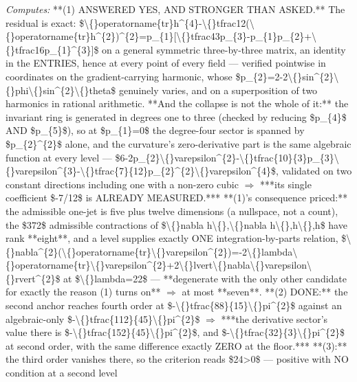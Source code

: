 \begin{description}
\emph{Computes:} **(1) ANSWERED YES, AND STRONGER THAN ASKED.** The residual is exact: \$\textbackslash\{\}operatorname\{tr\}h\textasciicircum{}\{4\}-\textbackslash\{\}tfrac12(\textbackslash\{\}operatorname\{tr\}h\textasciicircum{}\{2\})\textasciicircum{}\{2\}=p\_\{1\}[\textbackslash\{\}tfrac43p\_\{3\}-p\_\{1\}p\_\{2\}+\textbackslash\{\}tfrac16p\_\{1\}\textasciicircum{}\{3\}]\$ on a general symmetric three-by-three matrix, an identity in the ENTRIES, hence at every point of every field --- verified pointwise in coordinates on the gradient-carrying harmonic, whose \$p\_\{2\}=2-2\textbackslash\{\}sin\textasciicircum{}\{2\}\textbackslash\{\}phi\textbackslash\{\}sin\textasciicircum{}\{2\}\textbackslash\{\}theta\$ genuinely varies, and on a superposition of two harmonics in rational arithmetic.  **And the collapse is not the whole of it:** the invariant ring is generated in degrees one to three (checked by reducing \$p\_\{4\}\$ AND \$p\_\{5\}\$), so at \$p\_\{1\}=0\$ the degree-four sector is spanned by \$p\_\{2\}\textasciicircum{}\{2\}\$ alone, and the curvature's zero-derivative part is the same algebraic function at every level --- \$6-2p\_\{2\}\textbackslash\{\}varepsilon\textasciicircum{}\{2\}-\textbackslash\{\}tfrac\{10\}\{3\}p\_\{3\}\textbackslash\{\}varepsilon\textasciicircum{}\{3\}-\textbackslash\{\}tfrac\{7\}\{12\}p\_\{2\}\textasciicircum{}\{2\}\textbackslash\{\}varepsilon\textasciicircum{}\{4\}\$, validated on two constant directions including one with a non-zero cubic \ensuremath{\Rightarrow} ***its single coefficient \$-7/12\$ is ALREADY MEASURED.***  **(1)'s consequence priced:** the admissible one-jet is five plus twelve dimensions (a nullspace, not a count), the \$372\$ admissible contractions of \$\textbackslash\{\}nabla h\textbackslash\{\},\textbackslash\{\}nabla h\textbackslash\{\},h\textbackslash\{\},h\$ have rank **eight**, and a level supplies exactly ONE integration-by-parts relation, \$\textbackslash\{\}nabla\textasciicircum{}\{2\}(\textbackslash\{\}operatorname\{tr\}\textbackslash\{\}varepsilon\textasciicircum{}\{2\})=-2\textbackslash\{\}lambda\textbackslash\{\}operatorname\{tr\}\textbackslash\{\}varepsilon\textasciicircum{}\{2\}+2\textbackslash\{\}lvert\textbackslash\{\}nabla\textbackslash\{\}varepsilon\textbackslash\{\}rvert\textasciicircum{}\{2\}\$ at \$\textbackslash\{\}lambda=22\$ --- **degenerate with the only other candidate for exactly the reason (1) turns on** \ensuremath{\Rightarrow} at most **seven**. **(2) DONE:** the second anchor reaches fourth order at \$-\textbackslash\{\}tfrac\{88\}\{15\}\textbackslash\{\}pi\textasciicircum{}\{2\}\$ against an algebraic-only \$-\textbackslash\{\}tfrac\{112\}\{45\}\textbackslash\{\}pi\textasciicircum{}\{2\}\$ \ensuremath{\Rightarrow} ***the derivative sector's value there is \$-\textbackslash\{\}tfrac\{152\}\{45\}\textbackslash\{\}pi\textasciicircum{}\{2\}\$, and \$-\textbackslash\{\}tfrac\{32\}\{3\}\textbackslash\{\}pi\textasciicircum{}\{2\}\$ at second order, with the same difference exactly ZERO at the floor.*** **(3):** the third order vanishes there, so the criterion reads \$24>0\$ --- positive with NO condition at a second level

\end{description}
